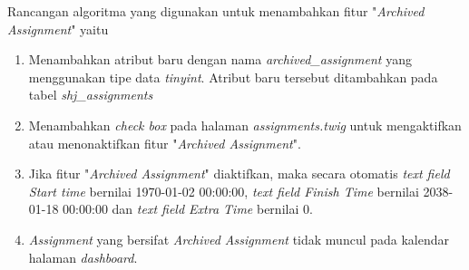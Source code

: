 Rancangan algoritma yang digunakan untuk menambahkan fitur "\textit{Archived Assignment}" yaitu
\begin{enumerate}
	\item Menambahkan atribut baru dengan nama \textit{archived\_assignment} yang menggunakan tipe data \textit{tinyint}. Atribut baru tersebut ditambahkan pada tabel \textit{shj\_assignments}
	\item Menambahkan \textit{check box} pada halaman \textit{assignments.twig} untuk mengaktifkan atau menonaktifkan fitur "\textit{Archived Assignment}".
	\item Jika fitur "\textit{Archived Assignment}" diaktifkan, maka secara otomatis \textit{text field Start time} bernilai 1970-01-02 00:00:00, \textit{text field Finish Time} bernilai 2038-01-18 00:00:00 dan \textit{text field Extra Time} bernilai 0.
	\item \textit{Assignment} yang bersifat \textit{Archived Assignment} tidak muncul pada kalendar halaman \textit{dashboard}.
\end{enumerate}

